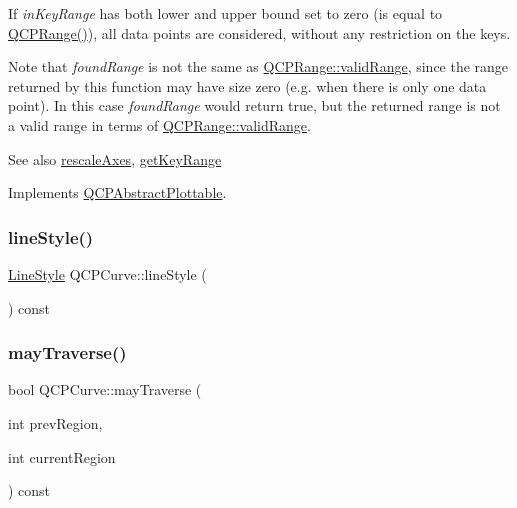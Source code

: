 If {\itshape in\+Key\+Range} has both lower and upper bound set to zero (is equal to {\ttfamily \hyperlink{class_q_c_p_range}{Q\+C\+P\+Range()}}), all data points are considered, without any restriction on the keys.

Note that {\itshape found\+Range} is not the same as \hyperlink{class_q_c_p_range_ab38bd4841c77c7bb86c9eea0f142dcc0}{Q\+C\+P\+Range\+::valid\+Range}, since the range returned by this function may have size zero (e.\+g. when there is only one data point). In this case {\itshape found\+Range} would return true, but the returned range is not a valid range in terms of \hyperlink{class_q_c_p_range_ab38bd4841c77c7bb86c9eea0f142dcc0}{Q\+C\+P\+Range\+::valid\+Range}.

\begin{DoxySeeAlso}{See also}
\hyperlink{class_q_c_p_abstract_plottable_a1491c4a606bccd2d09e65e11b79eb882}{rescale\+Axes}, \hyperlink{class_q_c_p_curve_a22d09087f78f254731197cc0b8783299}{get\+Key\+Range} 
\end{DoxySeeAlso}


Implements \hyperlink{class_q_c_p_abstract_plottable_a4de773988b21ed090fddd27c6a3a3dcb}{Q\+C\+P\+Abstract\+Plottable}.

\mbox{\label{class_q_c_p_curve_a06e3cf3f8f1add689254b3cda66e040e}} 
\subsubsection{\texorpdfstring{line\+Style()}{lineStyle()}}
{\footnotesize\ttfamily \hyperlink{class_q_c_p_curve_a2710e9f79302152cff794c6e16cc01f1}{Line\+Style} Q\+C\+P\+Curve\+::line\+Style (\begin{DoxyParamCaption}{ }\end{DoxyParamCaption}) const\hspace{0.3cm}{\ttfamily [inline]}}

\mbox{\label{class_q_c_p_curve_af5df2560b30333fe662ec676bd355415}} 
\subsubsection{\texorpdfstring{may\+Traverse()}{mayTraverse()}}
{\footnotesize\ttfamily bool Q\+C\+P\+Curve\+::may\+Traverse (\begin{DoxyParamCaption}\item[{int}]{prev\+Region,  }\item[{int}]{current\+Region }\end{DoxyParamCaption}) const\hspace{0.3cm}{\ttfamily [protected]}}

